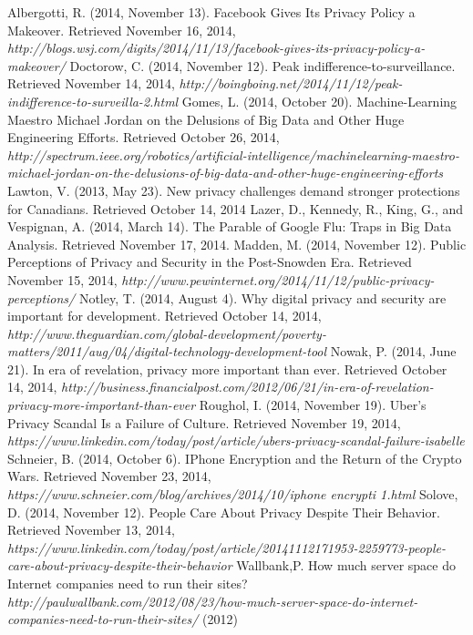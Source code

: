 \documentclass[12pt]{article}
\begin{document}
\clearpage
\singlespace
\begin{thebibliography}{99}
	Albergotti, R. (2014, November 13). Facebook Gives Its Privacy Policy a Makeover. Retrieved November 16, 2014, {\sl http://blogs.wsj.com/digits/2014/11/13/facebook-gives-its-privacy-policy-a-makeover/}
	Doctorow, C. (2014, November 12). Peak indifference-to-surveillance. Retrieved November 14, 2014, {\sl http://boingboing.net/2014/11/12/peak-indifference-to-surveilla-2.html}
	Gomes, L. (2014, October 20). Machine-Learning Maestro Michael Jordan on the Delusions of Big Data and Other Huge Engineering Efforts. Retrieved October 26, 2014, {\sl http://spectrum.ieee.org/robotics/artificial-intelligence/machinelearning-maestro-michael-jordan-on-the-delusions-of-big-data-and-other-huge-engineering-efforts}
	Lawton, V. (2013, May 23). New privacy challenges demand stronger protections for Canadians. Retrieved October 14, 2014
	Lazer, D., Kennedy, R., King, G., and Vespignan, A. (2014, March 14). The Parable of Google Flu: Traps in Big Data Analysis. Retrieved November 17, 2014.
	Madden, M. (2014, November 12). Public Perceptions of Privacy and Security in the Post-Snowden Era. Retrieved November 15, 2014, {\sl http://www.pewinternet.org/2014/11/12/public-privacy-perceptions/}
	Notley, T. (2014, August 4). Why digital privacy and security are important for development. Retrieved October 14, 2014, {\sl http://www.theguardian.com/global-development/poverty-matters/2011/aug/04/digital-technology-development-tool}
	Nowak, P. (2014, June 21). In era of revelation, privacy more important than ever. Retrieved October 14, 2014, {\sl http://business.financialpost.com/2012/06/21/in-era-of-revelation-privacy-more-important-than-ever}
	Roughol, I. (2014, November 19). Uber's Privacy Scandal Is a Failure of Culture. Retrieved November 19, 2014, {\sl
	https://www.linkedin.com/today/post/article/ubers-privacy-scandal-failure-isabelle}
	Schneier, B. (2014, October 6). IPhone Encryption and the Return of the Crypto Wars. Retrieved November 23, 2014, {\sl https://www.schneier.com/blog/archives/2014/10/iphone \textunderscore encrypti \textunderscore 1.html}
	Solove, D. (2014, November 12). People Care About Privacy Despite Their Behavior. Retrieved November 13, 2014, {\sl https://www.linkedin.com/today/post/article/20141112171953-2259773-people-care-about-privacy-despite-their-behavior}
	Wallbank,P. How much server space do Internet companies need to run their sites? {\sl http://paulwallbank.com/2012/08/23/how-much-server-space-do-internet-companies-need-to-run-their-sites/} (2012)


\end{thebibliography}
\end{document}
